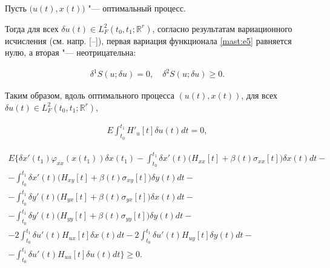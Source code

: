 Пусть $ \bigl( u(t), x(t) \bigr)  $ "--- оптимальный процесс. 

Тогда для всех $ \delta u(t)\in L^{2}_{F}(t_{0}, t_{1}; \mathbb R^{r}) $, согласно результатам вариационного исчисления (см. напр. [--]), первая вариация функционала \eqref{mast:e5} равняется нулю, а вторая "--- неотрицательна:

\begin{gather*}

\delta^{1} S(u; \delta u)=0, \quad 

\delta^{2} S(u; \delta u)\geq 0.

 \end{gather*}



Таким образом, вдоль оптимального процесса $ \left( u(t), x(t) \right)  $, для всех  $ \delta u(t)\in L^{2}_{F}(t_{0}, t_{1}; \mathbb R^{r}) $,

\begin{gather}

  \label{mast:e22}

E \int^{t_{1}}_{t_{0}} H'_{u}[t] \delta u(t)dt=0,

 \end{gather}

\begin{multline}

  \label{mast:e23}

E \biggl\{ 

 \delta x'(t_{1}) \varphi_{xx}(x(t_{1})) \delta x(t_{1}) -

\int^{t_{1}}_{t_{0}} \delta x'(t)\bigl( H_{xx}[t] +\beta (t) \sigma_{xx}[t]\bigr) \delta x(t)dt- 

\\ 

- \int^{t_{1}}_{t_{0}} \delta x'(t)\bigl( H_{xy}[t] +\beta (t) \sigma_{xy}[t]\bigr) \delta y(t)dt-

\\

- \int^{t_{1}}_{t_{0}} \delta y'(t)\bigl( H_{yx}[t] +\beta (t) \sigma_{yx}[t]\bigr) \delta x(t)dt-  

\\ 

- \int^{t_{1}}_{t_{0}} \delta y'(t)\bigl( H_{yy}[t] +\beta (t) \sigma_{yy}[t]\bigr) \delta y(t)dt-

\\

- 2\int^{t_{1}}_{t_{0}} \delta u'(t)H_{ux}[t] \delta x(t)dt

- 2\int^{t_{1}}_{t_{0}} \delta u'(t)H_{uy}[t] \delta y(t)dt- \\

- \int^{t_{1}}_{t_{0}} \delta u'(t)H_{uu}[t] \delta u(t)dt\biggr\}\geq 0  . 

 \end{multline}



